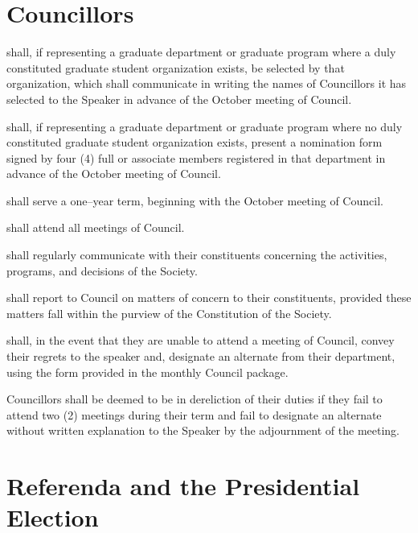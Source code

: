 \newpage


\section{Councillors}
\begin{longenum}[ label*=\thesection.\arabic*., align=left]
	\item shall, if representing a graduate department or graduate program where a duly constituted graduate student organization exists, be selected by that organization, which shall communicate in writing the names of Councillors it has selected to the Speaker in advance of the October meeting of Council. 
    \item shall, if representing a graduate department or graduate program where no duly constituted graduate student organization  exists, present a nomination form signed by four (4) full or associate members registered in that department in advance of the October meeting of Council. 
    \item shall serve a one--year term, beginning with the October meeting of Council. 
    \item shall attend all meetings of Council.
    \item shall regularly communicate with their constituents concerning the activities, programs, and decisions of the Society. 
    \item shall report to Council on matters of concern to their constituents, provided these matters fall within the purview of the Constitution of the Society. 
    \item shall, in the event that they are unable to attend a meeting of Council, convey their regrets to the speaker and, designate an alternate from their department, using the form provided in the monthly Council package.
    \item Councillors shall be deemed to be in dereliction of their duties if they fail to attend two (2) meetings during their term and fail to designate an alternate without written explanation to the Speaker by the adjournment  of the meeting. 
\end{longenum}
\newpage
\section{Referenda and the Presidential Election}
 


